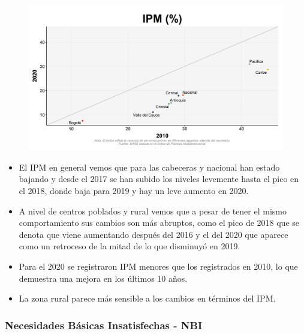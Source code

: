     \begin{figure}[H]
        \caption[Índice de Pobreza Multidimensional por zonas y nacional ]{\label{ipm_zonas} }
        \begin{center}
        \includegraphics[width=\textwidth,keepaspectratio]{img/var_270_scatter_time.png}
        \end{center}
    \end{figure}
            \begin{itemize}
                    \item El IPM en general vemos que para las cabeceras y nacional han estado bajando y desde el 2017 se han subido los niveles levemente hasta el pico en el 2018, donde baja para 2019 y hay un leve aumento en 2020.
                    \item A nivel de centros poblados y rural vemos que a pesar de tener el mismo comportamiento sus cambios son más abruptos, como el pico de 2018 que se denota que viene aumentando después del 2016 y el del 2020 que aparece como un retroceso de la mitad de lo que disminuyó en 2019.
                    \item Para el 2020 se registraron IPM menores que los registrados en 2010, lo que demuestra una mejora en los últimos 10 años.
                    \item La zona rural parece más sensible a los cambios en términos del IPM.
                    \end{itemize}

        \subsubsection{Necesidades Básicas Insatisfechas - NBI}
        
